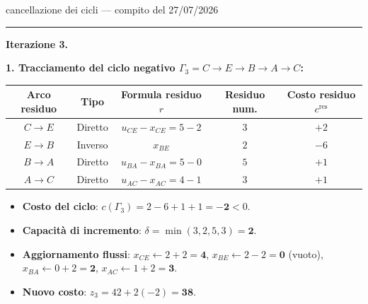 \documentclass[11pt,a4paper]{article}
\begin{document}
\begin{es}{cancellazione dei cicli --- compito del 27/07/2026}
\medskip
\hrule
\medskip

\textbf{Iterazione 3.}

\textbf{1. Tracciamento del ciclo negativo $\Gamma_3 = C \to E \to B \to A \to C$:}
\begin{center}
\small
\begin{tabular}{@{}ccccc@{}}
\toprule
\textbf{Arco residuo} & \textbf{Tipo} & \textbf{Formula residuo $r$} & \textbf{Residuo num.} & \textbf{Costo residuo $c^{\text{res}}$}\\
\midrule
$C \to E$ & Diretto & $u_{CE} - x_{CE} = 5 - 2$ & $3$ & $+2$\\
$E \to B$ & Inverso & $x_{BE}$ & $2$ & $-6$\\
$B \to A$ & Diretto & $u_{BA} - x_{BA} = 5 - 0$ & $5$ & $+1$\\
$A \to C$ & Diretto & $u_{AC} - x_{AC} = 4 - 1$ & $3$ & $+1$\\
\bottomrule
\end{tabular}
\end{center}
\begin{itemize}[itemsep=0.15em]
\item \textbf{Costo del ciclo}: $c(\Gamma_3) = 2 - 6 + 1 + 1 = \mathbf{-2} < 0$.
\item \textbf{Capacità di incremento}: $\delta = \min(3, 2, 5, 3) = \mathbf{2}$.
\item \textbf{Aggiornamento flussi}:
  $x_{CE} \leftarrow 2 + 2 = \mathbf{4}$, \quad
  $x_{BE} \leftarrow 2 - 2 = \mathbf{0}$ (vuoto), \quad
  $x_{BA} \leftarrow 0 + 2 = \mathbf{2}$, \quad
  $x_{AC} \leftarrow 1 + 2 = \mathbf{3}$.
\item \textbf{Nuovo costo}: $z_3 = 42 + 2(-2) = \mathbf{38}$.
\end{itemize}


\end{es}
\end{document}
